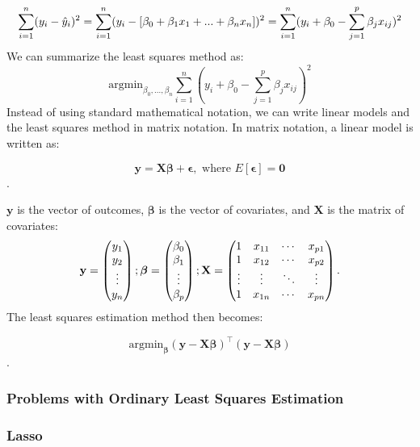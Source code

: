 \documentclass[
]{article}
\begin{document}
\[
\sum_{i=1}^n (y_i - \hat{y}_i)^2 = \sum_{i=1}^n (y_i - [\beta_0 +\beta_1x_1 + \space ...  \space + \beta_nx_n])^2 \\
= \sum_{i=1}^n ( y_i +\beta_0 - \sum_{j=1}^p \beta_jx_{ij} )^2
\] We can summarize the least squares method as: \[
\text{argmin}_{\beta_0,..., \beta_n}\sum_{i=1}^n ( y_i +\beta_0 - \sum_{j=1}^p \beta_jx_{ij} )^2
\] Instead of using standard mathematical notation, we can write linear
models and the least squares method in matrix notation. In matrix
notation, a linear model is written as:

\[\mathbf{y} = \mathbf{X}\boldsymbol\beta  + \boldsymbol\epsilon, \text{ where } E[\boldsymbol\epsilon] = \mathbf{0}\].

\(\mathbf{y}\) is the vector of outcomes, \(\boldsymbol\beta\) is the
vector of covariates, and \(\mathbf{X}\) is the matrix of covariates:
\[\mathbf{y} = \begin{pmatrix} y_1 \\ y_2 \\ \vdots \\ y_n \end{pmatrix}; \space\boldsymbol\beta = \begin{pmatrix} \beta_0 \\ \beta_1 \\ \vdots \\ \beta_p \end{pmatrix}; \space \mathbf{X} = \begin{pmatrix} 1 & x_{11} & \cdots & x_{p1} \\ 1 & x_{12} & \cdots & x_{p2} \\ \vdots & \vdots & \ddots & \vdots \\ 1 & x_{1n} & \cdots & x_{pn} \end{pmatrix}.\]
The least squares estimation method then becomes:

\[\text{argmin}_{\boldsymbol\beta} (\mathbf{y} - \mathbf{X}\boldsymbol\beta)^\top(\mathbf{y} - \mathbf{X}\boldsymbol\beta)\].

\hypertarget{problems-with-ordinary-least-squares-estimation}{%
\subsubsection{Problems with Ordinary Least Squares
Estimation}\label{problems-with-ordinary-least-squares-estimation}}

\hypertarget{lasso}{%
\subsubsection{Lasso}\label{lasso}}
\end{document}

